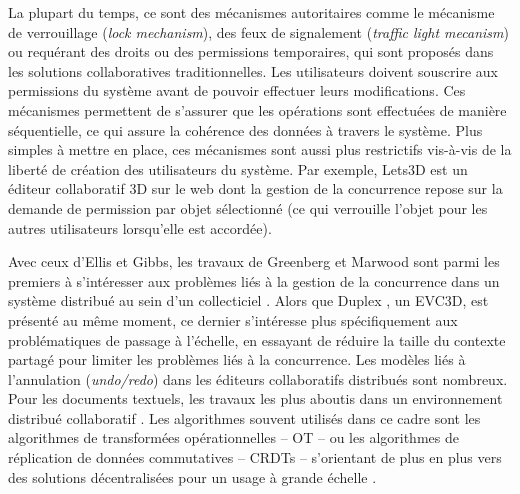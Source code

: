 La plupart du temps, ce sont des mécanismes autoritaires comme le mécanisme 
de verrouillage (\textit{lock mechanism}), des feux de signalement (\textit{traffic 
light mecanism}) ou requérant des droits ou des permissions temporaires, qui sont 
proposés dans les solutions collaboratives traditionnelles. Les utilisateurs doivent 
souscrire aux permissions du système avant de pouvoir effectuer leurs 
modifications. Ces mécanismes permettent de s'assurer que les opérations sont 
effectuées de manière séquentielle, ce qui assure la cohérence des données à 
travers le système. Plus simples à mettre en place, ces mécanismes sont aussi plus 
restrictifs vis-à-vis de la liberté de création des utilisateurs du système. Par 
exemple, Lets3D \cite{Ha2015} est un éditeur collaboratif 3D sur le web dont la 
gestion de la concurrence repose sur la demande de permission par objet 
sélectionné (ce qui verrouille l'objet pour les autres utilisateurs lorsqu'elle est 
accordée).

 Avec ceux d'Ellis et Gibbs, les travaux de Greenberg et Marwood sont parmi les 
premiers à s'intéresser aux problèmes liés à la gestion de la concurrence dans 
un système distribué au sein d'un collecticiel \cite{Ellis1989,Greenberg1994}. 
Alors que Duplex \cite{Pacull1994}, un \gls{EVC3D}, est présenté au même 
moment, ce dernier s'intéresse plus spécifiquement aux problématiques de 
passage à l'échelle, en essayant de réduire la taille du contexte partagé pour 
limiter les problèmes liés à la concurrence. 
Les modèles liés à l'annulation (\textit{undo/redo}) dans les éditeurs collaboratifs 
distribués sont nombreux. Pour les documents textuels, les travaux les plus 
aboutis dans un environnement distribué collaboratif 
\cite{Prakash1994,Sun2002,Ressel}. Les 
algorithmes souvent utilisés dans ce cadre sont les algorithmes 
de  transformées opérationnelles -- \gls{OT} -- \cite{Ellis1989} ou les algorithmes 
de réplication de  données commutatives -- \glspl{CRDT} -- \cite{Shapiro2007} 
s'orientant de plus en plus vers des solutions décentralisées pour un usage à 
grande échelle \cite{Weiss2009a}. 

